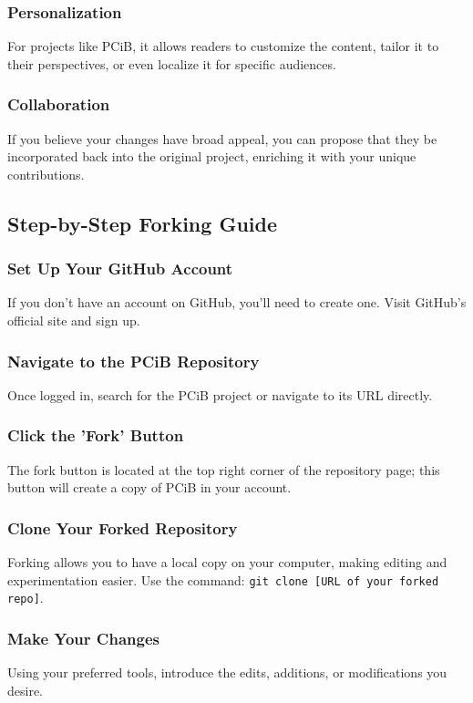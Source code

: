 \documentclass[a4paper,12pt]{book}
\begin{document}
\subsubsection*{Personalization}
For projects like PCiB, it allows readers to customize the content, tailor it to their perspectives, or even localize it for specific audiences.

\subsubsection*{Collaboration}
If you believe your changes have broad appeal, you can propose that they be incorporated back into the original project, enriching it with your unique contributions.

\subsection*{Step-by-Step Forking Guide}
\subsubsection*{Set Up Your GitHub Account}
If you don't have an account on GitHub, you'll need to create one. Visit GitHub's official site and sign up.

\subsubsection*{Navigate to the PCiB Repository}
Once logged in, search for the PCiB project or navigate to its URL directly.

\subsubsection*{Click the 'Fork' Button}
The fork button is located at the top right corner of the repository page; this button will create a copy of PCiB in your account.

\subsubsection*{Clone Your Forked Repository}
Forking allows you to have a local copy on your computer, making editing and experimentation easier. Use the command: \texttt{git clone [URL of your forked repo]}.

\subsubsection*{Make Your Changes}
Using your preferred tools, introduce the edits, additions, or modifications you desire.
\end{document}
